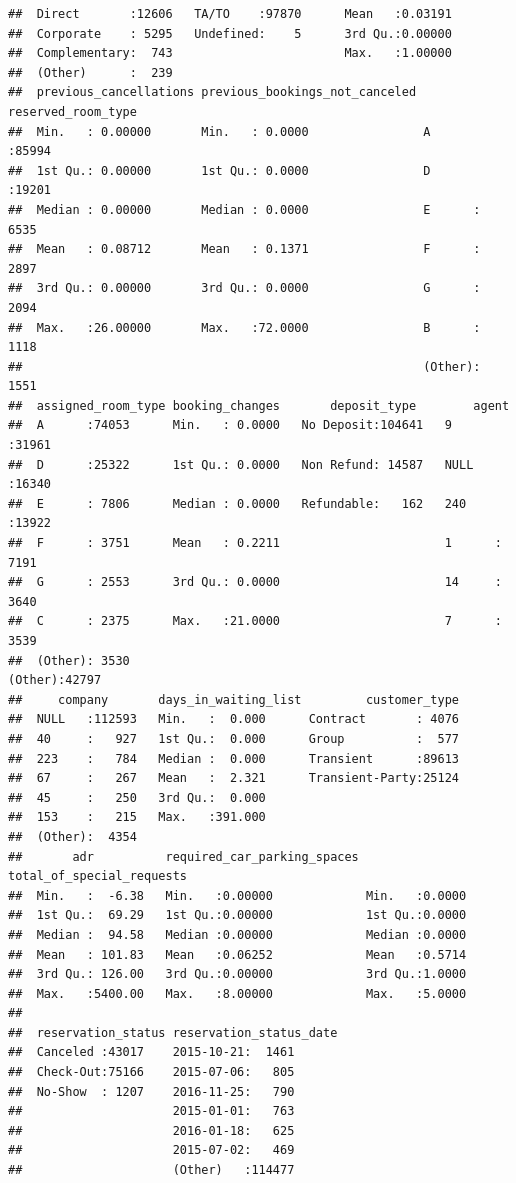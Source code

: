 \documentclass[
]{article}
\begin{document}
\begin{verbatim}
##  Direct       :12606   TA/TO    :97870      Mean   :0.03191  
##  Corporate    : 5295   Undefined:    5      3rd Qu.:0.00000  
##  Complementary:  743                        Max.   :1.00000  
##  (Other)      :  239                                         
##  previous_cancellations previous_bookings_not_canceled reserved_room_type
##  Min.   : 0.00000       Min.   : 0.0000                A      :85994     
##  1st Qu.: 0.00000       1st Qu.: 0.0000                D      :19201     
##  Median : 0.00000       Median : 0.0000                E      : 6535     
##  Mean   : 0.08712       Mean   : 0.1371                F      : 2897     
##  3rd Qu.: 0.00000       3rd Qu.: 0.0000                G      : 2094     
##  Max.   :26.00000       Max.   :72.0000                B      : 1118     
##                                                        (Other): 1551     
##  assigned_room_type booking_changes       deposit_type        agent      
##  A      :74053      Min.   : 0.0000   No Deposit:104641   9      :31961  
##  D      :25322      1st Qu.: 0.0000   Non Refund: 14587   NULL   :16340  
##  E      : 7806      Median : 0.0000   Refundable:   162   240    :13922  
##  F      : 3751      Mean   : 0.2211                       1      : 7191  
##  G      : 2553      3rd Qu.: 0.0000                       14     : 3640  
##  C      : 2375      Max.   :21.0000                       7      : 3539  
##  (Other): 3530                                            (Other):42797  
##     company       days_in_waiting_list         customer_type  
##  NULL   :112593   Min.   :  0.000      Contract       : 4076  
##  40     :   927   1st Qu.:  0.000      Group          :  577  
##  223    :   784   Median :  0.000      Transient      :89613  
##  67     :   267   Mean   :  2.321      Transient-Party:25124  
##  45     :   250   3rd Qu.:  0.000                             
##  153    :   215   Max.   :391.000                             
##  (Other):  4354                                               
##       adr          required_car_parking_spaces total_of_special_requests
##  Min.   :  -6.38   Min.   :0.00000             Min.   :0.0000           
##  1st Qu.:  69.29   1st Qu.:0.00000             1st Qu.:0.0000           
##  Median :  94.58   Median :0.00000             Median :0.0000           
##  Mean   : 101.83   Mean   :0.06252             Mean   :0.5714           
##  3rd Qu.: 126.00   3rd Qu.:0.00000             3rd Qu.:1.0000           
##  Max.   :5400.00   Max.   :8.00000             Max.   :5.0000           
##                                                                         
##  reservation_status reservation_status_date
##  Canceled :43017    2015-10-21:  1461      
##  Check-Out:75166    2015-07-06:   805      
##  No-Show  : 1207    2016-11-25:   790      
##                     2015-01-01:   763      
##                     2016-01-18:   625      
##                     2015-07-02:   469      
##                     (Other)   :114477
\end{verbatim}
\end{document}
